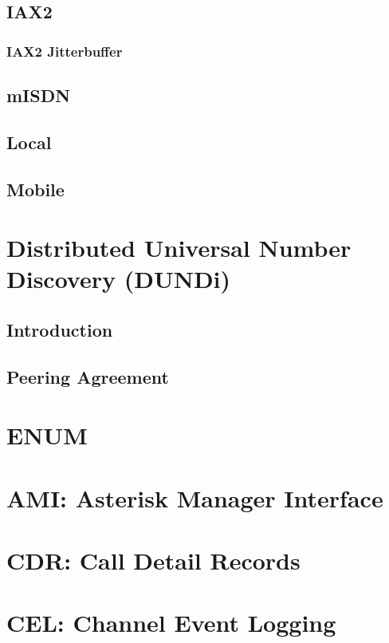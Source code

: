 \documentclass[12pt,a4]{report}
\begin{document}
  \section{IAX2}
  
    \subsection{IAX2 Jitterbuffer}
    
  \section{mISDN}
  
  \section{Local}
  
  \section{Mobile}
  

\chapter{Distributed Universal Number Discovery (DUNDi)}
  \section{Introduction}
  
  \section{Peering Agreement}
  

\chapter{ENUM}


\chapter{AMI: Asterisk Manager Interface}
  
  

\chapter{CDR: Call Detail Records}



\chapter{CEL: Channel Event Logging}


\end{document}
